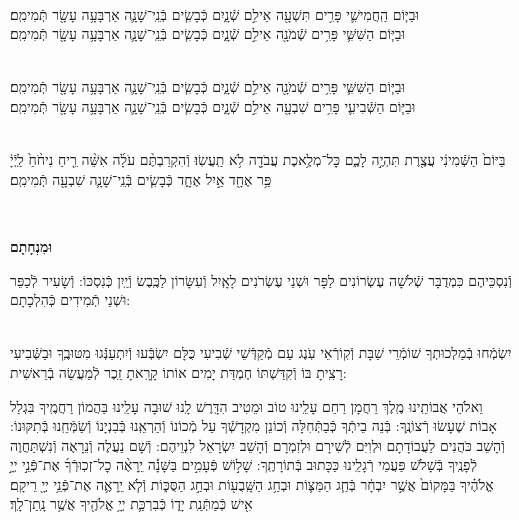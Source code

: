 \documentclass[twoside, openany, parskip=half, 11pt]{book}
\begin{document}
 \\
וּבַיּ֧וֹם הַֽחֲמִישִׁ֛י פָּרִ֥ים תִּשְׁעָ֖ה אֵילִ֣ם שְֿׁנָ֑יִם כְּֿבָשִׂ֧ים בְּֿנֵֽי־שָׁנָ֛ה אַרְבָּעָ֥ה עָשָׂ֖ר תְּֿמִימִֽם׃
\\
וּבַיּ֧וֹם הַשִּׁשִּׁ֛י פָּרִ֥ים שְֿׁמֹנָ֖ה אֵילִ֣ם שְֿׁנָ֑יִם כְּֿבָשִׂ֧ים בְּֿנֵֽי־שָׁנָ֛ה אַרְבָּעָ֥ה עָשָׂ֖ר תְּֿמִימִֽם׃



 \\
וּבַיּ֧וֹם הַשִּׁשִּׁ֛י פָּרִ֥ים שְֿׁמֹנָ֖ה אֵילִ֣ם שְֿׁנָ֑יִם כְּֿבָשִׂ֧ים בְּֿנֵֽי־שָׁנָ֛ה אַרְבָּעָ֥ה עָשָׂ֖ר תְּֿמִימִֽם׃
\\
וּבַיּ֧וֹם הַשְּֿׁבִיעִ֛י פָּרִ֥ים שִׁבְעָ֖ה אֵילִ֣ם שְֿׁנָ֑יִם כְּֿבָשִׂ֧ים בְּֿנֵֽי־שָׁנָ֛ה אַרְבָּעָ֥ה עָשָׂ֖ר תְּֿמִימִֽם׃



\\
בַּיּוֹם֙ הַשְּֿׁמִינִ֔י עֲצֶ֖רֶת תִּהְיֶ֣ה לָכֶ֑ם כׇּל־מְלֶ֥אכֶת עֲבֹדָ֖ה לֹ֥א תַֽעֲשֽׂוּ׃ וְֿהִקְרַבְתֶּ֨ם עֹלָ֜ה אִשֵּׁ֨ה רֵ֤יחַ נִיחֹ֨חַ֙ לַֽיְֿיָ֔ פַּ֥ר אֶחָ֖ד אַ֣יִל אֶחָ֑ד כְּֿבָשִׂ֧ים בְּֿנֵֽי־שָׁנָ֛ה שִׁבְעָ֖ה תְּֿמִימִֽם׃

\\ \label{uminchasam}
\begin{Large}\textbf{וּמִנְחָתָם}\end{Large}
וְֿנִסְכֵּיהֶם כִּמְדֻבָּר שְֿׁלֹשָׁה עֶשְׂרוֹנִים לַפָּר וּשְׁנֵי עֶשְׂרֹנִים לָאָֽיִל וְֿעִשָּׂרוֹן לַכֶּֽבֶשׂ וְֿיַֽיִן כְּֿנִסְכּוֹ: וְֿשָׂעִיר לְֿכַפֵּר וּשְׁנֵי תְֿמִידִים כְּֿהִלְכָתָם:

\begin{sometimes}

\shabbos\\
יִשְׂמְֿחוּ בְֿמַלְכוּתְךָ שׁוֹמְֿרֵי שַׁבָּת וְֿקֽוֹרְֿאֵי עֹֽנֶג עַם מְֿקַדְּֿשֵׁי שְֿׁבִיעִי כֻּלָּם יִשְׂבְּֿעוּ וְֿיִתְעַנְּֿגוּ מִטּוּבֶֽךָ וּבַשְּֿׁבִיעִי רָצִֽיתָ בּוֹ וְֿקִדַּשְׁתּוֹ חֶמְדַּת יָמִים אוֹתוֹ קָרָֽאתָ זֵֽכֶר לְֿמַעֲשֵׂה בְֿרֵאשִׁית:

\end{sometimes}

\enlargethispage{\baselineskip}
וֵאלֹהֵי אֲבוֹתֵֽינוּ מֶֽלֶךְ רַחֲמָן רַחֵם עָלֵֽינוּ טוֹב וּמֵטִיב הִדָּֽרֶשׁ לָֽנוּ שׁוּבָה עָלֵֽינוּ בַּהֲמוֹן רַחֲמֶֽיךָ בִּגְלַל אָבוֹת שֶׁעָשׂוּ רְֿצוֹנֶֽךָ: בְּֿנֵה בֵיתְֿךָ כְּֿבַתְּֿחִלָּה וְֿכוֹנֵן מִקְדָשְֿׁךָ עַל מְֿכוֹנוֹ וְֿהַרְאֵֽנוּ בְּֿבִנְיָנוֹ וְֿשַׂמְּֿחֵֽנוּ בְּֿתִקּוּנוֹ: וְֿהָשֵׁב כֹּהֲנִים לַעֲבוֹדָתָם וּלְוִיִּם לְֿשִׁירָם וּלְזִמְרָם וְֿהָשֵׁב יִשְׂרָאֵל לִנְוֵיהֶם: וְֿשָׁם נַעֲלֶה וְֿנֵרָאֶה וְֿנִשְׁתַּחֲוֶה לְֿפָנֶֽיךָ בְּֿשָׁלֹֹשׁ פַּעֲמֵי רְֿגָלֵֽינוּ כַּכָּתוּב בְּֿתוֹרָתֶֽךָ: שָׁל֣וֹשׁ פְּֿעָמִ֣ים בַּשָּׁנָ֡ה יֵֽרָאֶ֨ה כׇל־זְכֽוּרְֿךָ֜ אֶת־פְּֿנֵ֣י יְיָ֣ אֱלֹהֶ֗יךָ בַּמָּקוֹם֙ אֲשֶׁ֣ר יִבְחָ֔ר בְּֿחַ֧ג הַמַּצּ֛וֹת וּבְחַ֥ג הַשָּֽׁבֻע֖וֹת וּבְחַ֣ג הַסֻּכּ֑וֹת וְֿלֹ֧א יֵֽרָאֶ֛ה אֶת־פְּֿנֵ֥י יְיָ֖ רֵיקָֽם׃ אִ֖ישׁ כְּֿמַתְּֿנַֽת יָד֑וֹ כְּֿבִרְכַּ֛ת יְיָ֥ אֱלֹהֶ֖יךָ אֲשֶׁ֥ר נָֽתַן־לָֽךְ׃
\end{document}
